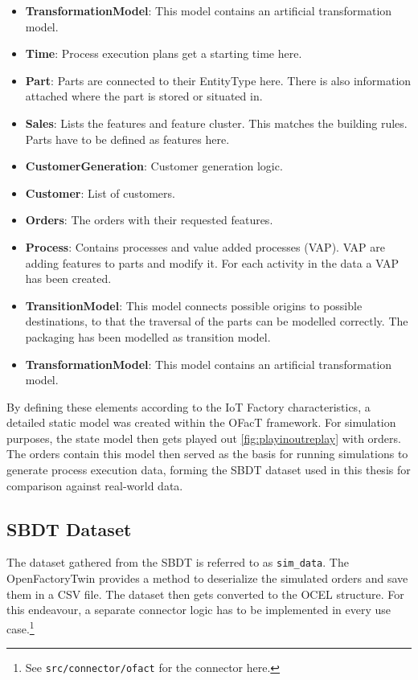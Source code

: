\begin{itemize}
  \item \textbf{TransformationModel}: This model contains an artificial transformation model.
  \item \textbf{Time}: Process execution plans get a starting time here.
  \item \textbf{Part}: Parts are connected to their EntityType here. There is also information attached where the part is stored or situated in.
  \item \textbf{Sales}: Lists the features and feature cluster. This matches the building rules. Parts have to be defined as features here.
  \item \textbf{CustomerGeneration}: Customer generation logic.
  \item \textbf{Customer}: List of customers.
  \item \textbf{Orders}: The orders with their requested features.
  \item \textbf{Process}: Contains processes and value added processes (VAP). VAP are adding features to parts and modify it. For each activity in the data a VAP has been created.
  \item \textbf{TransitionModel}: This model connects possible origins to possible destinations, to that the traversal of the parts can be modelled correctly. The packaging has been modelled as transition model.
  \item \textbf{TransformationModel}: This model contains an artificial transformation model.
\end{itemize}

By defining these elements according to the IoT Factory characteristics, a detailed static model was created within the OFacT framework. For simulation purposes, the state model then gets played out \autoref{fig:playinoutreplay} with orders. The orders contain this model then served as the basis for running simulations to generate process execution data, forming the SBDT dataset used in this thesis for comparison against real-world data.

\subsection*{SBDT Dataset}

The dataset gathered from the SBDT is referred to as \texttt{sim\_data}. The OpenFactoryTwin provides a method to deserialize the simulated orders and save them in a CSV file. The dataset then gets converted to the OCEL structure. For this endeavour, a separate connector logic has to be implemented in every use case.\footnote{See \texttt{src/connector/ofact} for the connector here.}

